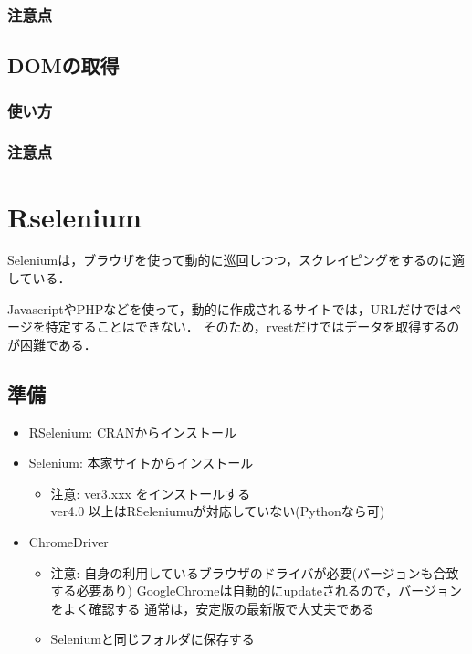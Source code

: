 \documentclass[
]{article}
\providecommand{\tightlist}{%
  \setlength{\itemsep}{0pt}\setlength{\parskip}{0pt}}
\begin{document}
\hypertarget{ux6ce8ux610fux70b9-3}{%
\subsubsection{注意点}\label{ux6ce8ux610fux70b9-3}}

\hypertarget{domux306eux53d6ux5f97}{%
\subsection{DOMの取得}\label{domux306eux53d6ux5f97}}

\hypertarget{ux4f7fux3044ux65b9-4}{%
\subsubsection{使い方}\label{ux4f7fux3044ux65b9-4}}

\hypertarget{ux6ce8ux610fux70b9-4}{%
\subsubsection{注意点}\label{ux6ce8ux610fux70b9-4}}

\hypertarget{rselenium}{%
\section{Rselenium}\label{rselenium}}

Seleniumは，ブラウザを使って動的に巡回しつつ，スクレイピングをするのに適している．

JavascriptやPHPなどを使って，動的に作成されるサイトでは，URLだけではページを特定することはできない．
そのため，rvestだけではデータを取得するのが困難である．

\hypertarget{ux6e96ux5099-1}{%
\subsection{準備}\label{ux6e96ux5099-1}}

\begin{itemize}
\tightlist
\item
  RSelenium: CRANからインストール\\
\item
  Selenium: 本家サイトからインストール

  \begin{itemize}
  \tightlist
  \item
    注意: ver3.xxx をインストールする\\
    ver4.0 以上はRSeleniumuが対応していない(Pythonなら可)\\
  \end{itemize}
\item
  ChromeDriver

  \begin{itemize}
  \tightlist
  \item
    注意: 自身の利用しているブラウザのドライバが必要(バージョンも合致する必要あり)
    GoogleChromeは自動的にupdateされるので，バージョンをよく確認する
    通常は，安定版の最新版で大丈夫である
  \item
    Seleniumと同じフォルダに保存する
  \end{itemize}
\end{itemize}
\end{document}
